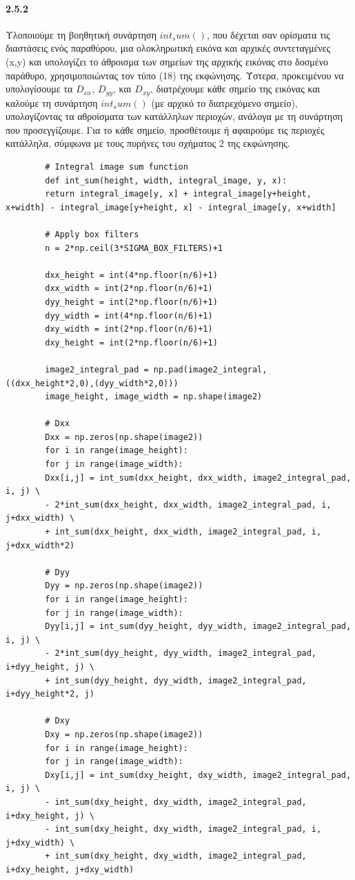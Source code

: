 \documentclass[]{article}
\begin{document}
	\paragraph{2.5.2} Υλοποιούμε τη βοηθητική συνάρτηση $int_sum()$, που δέχεται σαν ορίσματα τις διαστάσεις ενός παραθύρου, μια ολοκληρωτική εικόνα και αρχικές συντεταγμένες (x,y) και υπολογίζει το άθροισμα των σημείων της αρχικής εικόνας στο δοσμένο παράθυρο, χρησιμοποιώντας τον τύπο (18) της εκφώνησης. Ύστερα, προκειμένου να υπολογίσουμε τα $D_{xx}$, $D_{yy}$, και $D_{xy}$, διατρέχουμε κάθε σημείο της εικόνας και καλούμε τη συνάρτηση $int_sum()$ (με αρχικό το διατρεχόμενο σημείο), υπολογίζοντας τα αθροίσματα των κατάλληλων περιοχών, ανάλογα με τη συνάρτηση που προσεγγίζουμε. Για το κάθε σημείο, προσθέτουμε ή αφαιρούμε τις περιοχές κατάλληλα, σύμφωνα με τους πυρήνες του σχήματος 2 της εκφώνησης.
	\begin{lstlisting}
		# Integral image sum function
		def int_sum(height, width, integral_image, y, x):
		return integral_image[y, x] + integral_image[y+height, x+width] - integral_image[y+height, x] - integral_image[y, x+width]
		
		# Apply box filters
		n = 2*np.ceil(3*SIGMA_BOX_FILTERS)+1
		
		dxx_height = int(4*np.floor(n/6)+1)
		dxx_width = int(2*np.floor(n/6)+1)
		dyy_height = int(2*np.floor(n/6)+1)
		dyy_width = int(4*np.floor(n/6)+1)
		dxy_width = int(2*np.floor(n/6)+1)
		dxy_height = int(2*np.floor(n/6)+1)
		
		image2_integral_pad = np.pad(image2_integral, ((dxx_height*2,0),(dyy_width*2,0)))
		image_height, image_width = np.shape(image2)
		
		# Dxx
		Dxx = np.zeros(np.shape(image2))
		for i in range(image_height):
		for j in range(image_width):
		Dxx[i,j] = int_sum(dxx_height, dxx_width, image2_integral_pad, i, j) \
		- 2*int_sum(dxx_height, dxx_width, image2_integral_pad, i, j+dxx_width) \
		+ int_sum(dxx_height, dxx_width, image2_integral_pad, i, j+dxx_width*2)
		
		# Dyy
		Dyy = np.zeros(np.shape(image2))
		for i in range(image_height):
		for j in range(image_width):
		Dyy[i,j] = int_sum(dyy_height, dyy_width, image2_integral_pad, i, j) \
		- 2*int_sum(dyy_height, dyy_width, image2_integral_pad, i+dyy_height, j) \
		+ int_sum(dyy_height, dyy_width, image2_integral_pad, i+dyy_height*2, j)
		
		# Dxy
		Dxy = np.zeros(np.shape(image2))
		for i in range(image_height):
		for j in range(image_width):
		Dxy[i,j] = int_sum(dxy_height, dxy_width, image2_integral_pad, i, j) \
		- int_sum(dxy_height, dxy_width, image2_integral_pad, i+dxy_height, j) \
		- int_sum(dxy_height, dxy_width, image2_integral_pad, i, j+dxy_width) \
		+ int_sum(dxy_height, dxy_width, image2_integral_pad, i+dxy_height, j+dxy_width)
	\end{lstlisting}
\end{document}
